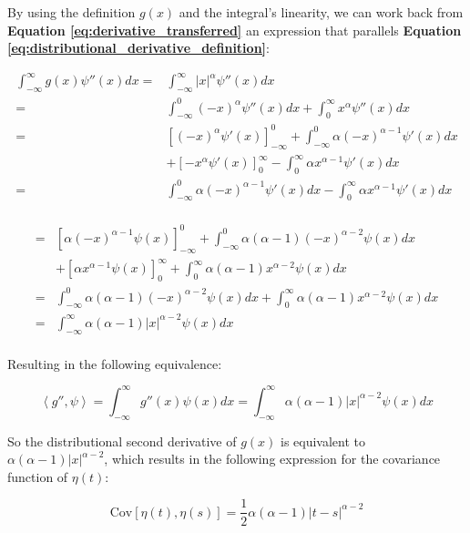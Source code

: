 By using the definition $g(x)$ and the integral's linearity, we can work back from \textbf{Equation \ref{eq:derivative_transferred}} an expression that parallels \textbf{Equation \ref{eq:distributional_derivative_definition}}:

\begin{align*}
    \int_{-\infty}^{\infty}g(x)\psi''(x)dx =& \int_{-\infty}^{\infty}\left|x\right|^\alpha \psi''(x)dx\\
    =& \int_{-\infty}^0(-x)^\alpha \psi''(x)dx + \int_{0}^{\infty}x^\alpha \psi''(x)dx\\
    =& \left[(-x)^\alpha\psi'(x)\right]_{-\infty}^0 + \int_{-\infty}^0\alpha(-x)^{\alpha - 1} \psi'(x)dx\\
    &+ \left[-x^\alpha\psi'(x)\right]_{0}^{\infty} - \int_{0}^{\infty}\alpha x^{\alpha - 1} \psi'(x)dx\\
    =& \int_{-\infty}^0\alpha(-x)^{\alpha - 1} \psi'(x)dx - \int_{0}^{\infty}\alpha x^{\alpha - 1} \psi'(x)dx\\
\end{align*}

\begin{align*}
    =& \left[\alpha(-x)^{\alpha-1}\psi(x)\right]_{-\infty}^0 + \int_{-\infty}^0\alpha(\alpha - 1)(-x)^{\alpha - 2} \psi(x)dx\\
    &+ \left[\alpha x^{\alpha - 1}\psi(x)\right]_{0}^{\infty} + \int_{0}^{\infty}\alpha(\alpha - 1)x^{\alpha - 2} \psi(x)dx\\
    =& \int_{-\infty}^0\alpha(\alpha - 1)(-x)^{\alpha - 2} \psi(x)dx + \int_{0}^{\infty}\alpha(\alpha - 1)x^{\alpha - 2} \psi(x)dx\\
    =& \int_{-\infty}^{\infty}\alpha(\alpha - 1)\left|x\right|^{\alpha - 2}\psi(x)dx\\
\end{align*}

Resulting in the following equivalence:

$$
\left\langle g'',\psi\right\rangle = \int_{-\infty}^{\infty}g''(x)\psi(x)dx = \int_{-\infty}^{\infty}\alpha(\alpha - 1)\left|x\right|^{\alpha - 2}\psi(x)dx
$$

So the distributional second derivative of $g(x)$ is equivalent to $\alpha(\alpha - 1)\left|x\right|^{\alpha - 2}$, which results in the following expression for the covariance function of $\eta(t)$:

\begin{equation}
\text{Cov}\left[\eta(t),\eta(s)\right] = \frac{1}{2}\alpha(\alpha - 1)\left|t-s\right|^{\alpha - 2}\label{eq:covariance-solved}
\end{equation}

